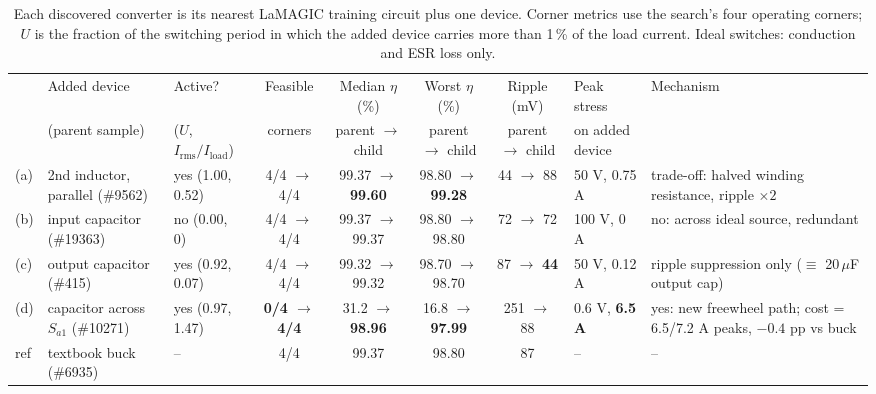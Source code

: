 \begin{table}[t]
\centering\small
\setlength{\tabcolsep}{4pt}
\begin{tabular}{@{}l l l c c c c l p{4.6cm}@{}}
\toprule
& Added device & Active? & Feasible & Median $\eta$ (\%) & Worst $\eta$ (\%) & Ripple (mV) & Peak stress & Mechanism \\
& (parent sample) & ($U$, $I_\mathrm{rms}/I_\mathrm{load}$) & corners & parent $\to$ child & parent $\to$ child & parent $\to$ child & on added device & \\
\midrule
(a) & 2nd inductor, parallel (\#9562) & yes (1.00, 0.52) & 4/4 $\to$ 4/4 & 99.37 $\to$ \textbf{99.60} & 98.80 $\to$ \textbf{99.28} & 44 $\to$ 88 & 50 V, 0.75 A & trade-off: halved winding resistance, ripple $\times 2$ \\
(b) & input capacitor (\#19363) & no (0.00, 0) & 4/4 $\to$ 4/4 & 99.37 $\to$ 99.37 & 98.80 $\to$ 98.80 & 72 $\to$ 72 & 100 V, 0 A & no: across ideal source, redundant \\
(c) & output capacitor (\#415) & yes (0.92, 0.07) & 4/4 $\to$ 4/4 & 99.32 $\to$ 99.32 & 98.70 $\to$ 98.70 & 87 $\to$ \textbf{44} & 50 V, 0.12 A & ripple suppression only ($\equiv$ 20\,$\mu$F output cap) \\
(d) & capacitor across $S_{a1}$ (\#10271) & yes (0.97, 1.47) & \textbf{0/4 $\to$ 4/4} & 31.2 $\to$ \textbf{98.96} & 16.8 $\to$ \textbf{97.99} & 251 $\to$ 88 & 0.6 V, \textbf{6.5 A} & yes: new freewheel path; cost = 6.5/7.2 A peaks, $-0.4$ pp vs buck \\
\midrule
ref & textbook buck (\#6935) & -- & 4/4 & 99.37 & 98.80 & 87 & -- & -- \\
\bottomrule
\end{tabular}
\caption{Each discovered converter is its nearest LaMAGIC training circuit plus one device. Corner metrics use the search's four operating corners; $U$ is the fraction of the switching period in which the added device carries more than 1\,\% of the load current. Ideal switches: conduction and ESR loss only.}
\label{tab:conv_parent_child}
\end{table}
